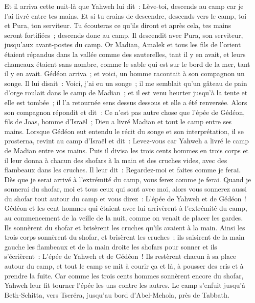 \begin{multicols}{2}
Et il arriva cette nuit-là que Yahweh lui dit~: Lève-toi, descends au camp car je l'ai livré entre tes mains.
Et si tu crains de descendre, descends vers le camp, toi et Pura, ton serviteur.
Tu écouteras ce qu'ils diront et après cela, tes mains seront fortifiées~; descends donc au camp. Il descendit avec Pura, son serviteur, jusqu'aux avant-postes du camp.
Or Madian, Amalek et tous les fils de l'orient étaient répandus dans la vallée comme des sauterelles, tant il y en avait, et leurs chameaux étaient sans nombre, comme le sable qui est sur le bord de la mer, tant il y en avait.
Gédéon arriva~; et voici, un homme racontait à son compagnon un songe. Il lui disait~: Voici, j'ai eu un songe~; il me semblait qu'un gâteau de pain d'orge roulait dans le camp de Madian~; et il est venu heurter jusqu'à la tente et elle est tombée~; il l'a retournée sens dessus dessous et elle a été renversée.
Alors son compagnon répondit et dit~: Ce n'est pas autre chose que l'épée de Gédéon, fils de Joas, homme d'Israël~; Dieu a livré Madian et tout le camp entre ses mains.
Lorsque Gédéon eut entendu le récit du songe et son interprétation, il se prosterna, revint au camp d'Israël et dit~: Levez-vous car Yahweh a livré le camp de Madian entre vos mains.
Puis il divisa les trois cents hommes en trois corps et il leur donna à chacun des shofars à la main et des cruches vides, avec des flambeaux dans les cruches.
Il leur dit~: Regardez-moi et faites comme je ferai. Dès que je serai arrivé à l'extrémité du camp, vous ferez comme je ferai.
Quand je sonnerai du shofar, moi et tous ceux qui sont avec moi, alors vous sonnerez aussi du shofar tout autour du camp et vous direz~: L'épée de Yahweh et de Gédéon~!
Gédéon et les cent hommes qui étaient avec lui arrivèrent à l'extrémité du camp, au commencement de la veille de la nuit, comme on venait de placer les gardes. Ils sonnèrent du shofar et brisèrent les cruches qu'ils avaient à la main.
Ainsi les trois corps sonnèrent du shofar, et brisèrent les cruches~; ils saisirent de la main gauche les flambeaux et de la main droite les shofars pour sonner et ils s'écrièrent~: L'épée de Yahweh et de Gédéon~!
Ils restèrent chacun à sa place autour du camp, et tout le camp se mit à courir ça et là, à pousser des cris et à prendre la fuite.
Car comme les trois cents hommes sonnèrent encore du shofar, Yahweh leur fit tourner l'épée les uns contre les autres. Le camp s'enfuit jusqu'à Beth-Schitta, vers Tseréra, jusqu'au bord d'Abel-Mehola, près de Tabbath.

\end{multicols}
